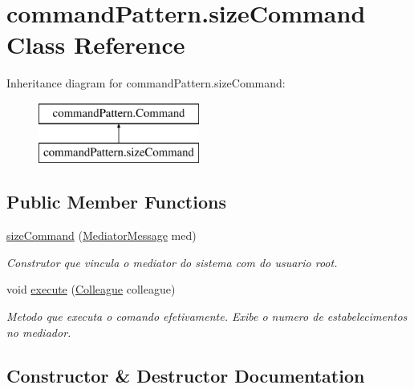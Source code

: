 \hypertarget{classcommand_pattern_1_1size_command}{}\section{command\+Pattern.\+size\+Command Class Reference}
\label{classcommand_pattern_1_1size_command}
Inheritance diagram for command\+Pattern.\+size\+Command\+:\begin{figure}[H]
\begin{center}
\leavevmode
\includegraphics[height=2.000000cm]{classcommand_pattern_1_1size_command}
\end{center}
\end{figure}
\subsection*{Public Member Functions}
\begin{DoxyCompactItemize}
\item 
\mbox{\hyperlink{classcommand_pattern_1_1size_command_a7de8105a378bd51d39dfe9cfd073c5cf}{size\+Command}} (\mbox{\hyperlink{classmediator_pattern_1_1_mediator_message}{Mediator\+Message}} med)
\begin{DoxyCompactList}\small\item\em Construtor que vincula o mediator do sistema com do usuario root. \end{DoxyCompactList}\item 
void \mbox{\hyperlink{classcommand_pattern_1_1size_command_a3f91f249324283b9ba2c7239e6fbc888}{execute}} (\mbox{\hyperlink{classmediator_pattern_1_1_colleague}{Colleague}} colleague)
\begin{DoxyCompactList}\small\item\em Metodo que executa o comando efetivamente. Exibe o numero de estabelecimentos no mediador. \end{DoxyCompactList}\end{DoxyCompactItemize}


\subsection{Constructor \& Destructor Documentation}
\mbox{\label{classcommand_pattern_1_1size_command_a7de8105a378bd51d39dfe9cfd073c5cf}} 
